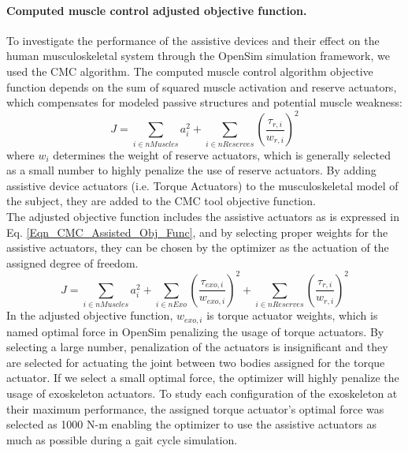 \documentclass[10pt,letterpaper]{article}
\begin{document}
\paragraph*{Computed muscle control adjusted objective function.} To investigate the performance of the assistive devices and their effect on the human musculoskeletal system through the OpenSim simulation framework, we used the CMC algorithm. The computed muscle control algorithm objective function depends on the sum of squared muscle activation and reserve actuators, which compensates for modeled passive structures and potential muscle weakness\cite{93}:
\begin{equation}\label{Eqn_CMC_Normal_Obj_Func}
J = \sum_{i\in nMuscles} a_{i}^{2} + \sum_{i \in nReserves} (\frac{\tau_{r,i}}{w_{r,i}})^2
\end{equation}
where $w_i$ determines the weight of reserve actuators, which is generally selected as a small number to highly penalize the use of reserve actuators. By adding assistive device actuators (i.e. Torque Actuators) to the musculoskeletal model of the subject, they are added to the CMC tool objective function.\\
The adjusted objective function includes the assistive actuators as is expressed in Eq. \eqref{Eqn_CMC_Assisted_Obj_Func}, and by selecting proper weights for the assistive actuators, they can be chosen by the optimizer as the actuation of the assigned degree of freedom.
\begin{equation}\label{Eqn_CMC_Assisted_Obj_Func}
	J = \sum_{i\in nMuscles} a_{i}^{2} + \sum_{i \in nExo} \left(\frac{\tau_{exo,i}}{w_{exo,i}}\right)^{2} +  \sum_{i \in nReserves} \left(\frac{\tau_{r,i}}{w_{r,i}}\right)^2
\end{equation}
In the adjusted objective function, $w_{exo,i}$ is torque actuator weights, which is named optimal force in OpenSim \cite{93} penalizing the usage of torque actuators. By selecting a large number, penalization of the actuators is insignificant and they are selected for actuating the joint between two bodies assigned for the torque actuator. If we select a small optimal force, the optimizer will highly penalize the usage of exoskeleton actuators. To study each configuration of the exoskeleton at their maximum performance, the assigned torque actuator's optimal force was selected as 1000 N-m enabling the optimizer to use the assistive actuators as much as possible during a gait cycle simulation.\\
\end{document}
